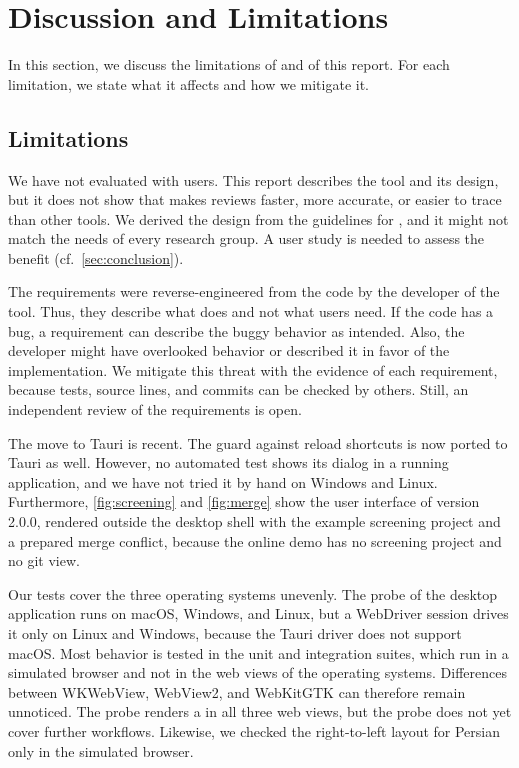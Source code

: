 \section{Discussion and Limitations}\label{sec:discussion}

In this section, we discuss the limitations of \SaiLoR and of this report.
For each limitation, we state what it affects and how we mitigate it.

\subsection{Limitations}\label{sec:discussion-limitations}

We have not evaluated \SaiLoR with users.
This report describes the tool and its design, but it does not show that \SaiLoR makes reviews faster, more accurate, or easier to trace than other tools.
We derived the design from the guidelines for \SLRs, and it might not match the needs of every research group.
A user study is needed to assess the benefit (cf.~\autoref{sec:conclusion}).

The requirements were reverse-engineered from the code by the developer of the tool.
Thus, they describe what \SaiLoR does and not what users need.
If the code has a bug, a requirement can describe the buggy behavior as intended.
Also, the developer might have overlooked behavior or described it in favor of the implementation.
We mitigate this threat with the evidence of each requirement, because tests, source lines, and commits can be checked by others.
Still, an independent review of the requirements is open.

The move to Tauri is recent.
The guard against reload shortcuts is now ported to Tauri as well.
However, no automated test shows its dialog in a running application, and we have not tried it by hand on Windows and Linux.
Furthermore, \autoref{fig:screening} and \autoref{fig:merge} show the user interface of version 2.0.0, rendered outside the desktop shell with the example screening project and a prepared merge conflict, because the online demo has no screening project and no git view.

Our tests cover the three operating systems unevenly.
The probe of the desktop application runs on macOS, Windows, and Linux, but a WebDriver session drives it only on Linux and Windows, because the Tauri driver does not support macOS.
Most behavior is tested in the unit and integration suites, which run in a simulated browser and not in the web views of the operating systems.
Differences between WKWebView, WebView2, and WebKitGTK can therefore remain unnoticed.
The \CI probe renders a \PDF in all three web views, but the probe does not yet cover further workflows.
Likewise, we checked the right-to-left layout for Persian only in the simulated browser.

